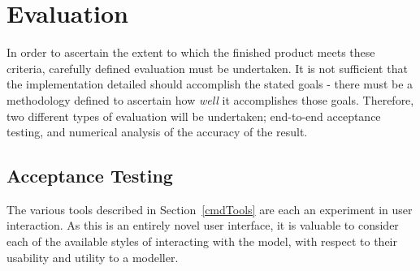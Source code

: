 \documentclass[a4paper,10pt]{article}
\begin{document}
\section{Evaluation}
In order to ascertain the extent to which the finished product meets these criteria, carefully defined evaluation must be undertaken. It is not sufficient that the implementation detailed should accomplish the stated goals - there must be a methodology defined to ascertain how \textit{well} it accomplishes those goals. Therefore, two different types of evaluation will be undertaken; end-to-end acceptance testing, and numerical analysis of the accuracy of the result.

\subsection{Acceptance Testing}
The various tools described in Section~\ref{cmdTools} are each an experiment in user interaction. As this is an entirely novel user interface, it is valuable to consider each of the available styles of interacting with the model, with respect to their usability and utility to a modeller.
\end{document}
